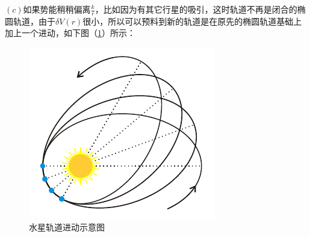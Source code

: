 \documentclass[UTF8,fontset=windows,oneside]{ctexbook}
\begin{document}
\noindent $(c)$如果势能稍稍偏离$\frac{k}{r}$，比如因为有其它行星的吸引，这时轨道不再是闭合的椭圆轨道，由于$\delta V(r)$很小，所以可以预料到新的轨道是在原先的椭圆轨道基础上加上一个进动，如下图（\ref{fig:1}）所示：
\begin{figure}[h]
    \centering
    \includegraphics[scale=0.8]{水星进动.pdf}
    \caption{水星轨道进动示意图}
    \label{fig:1}
\end{figure}
\end{document}
